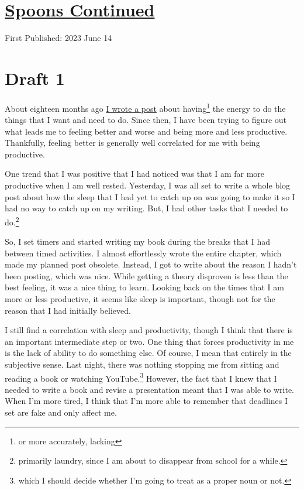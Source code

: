 \documentclass[12pt]{article}[titlepage]
\newcommand{\1}{\={a}}
\newcommand{\2}{\={e}}
\newcommand{\3}{\={\i}}
\newcommand{\4}{\=o}
\newcommand{\5}{\=u}
\newcommand{\6}{\={A}}
\renewcommand{\,}{\textsuperscript{,}}
\begin{document}
\doublespacing
\section{\href{spoons-2.html}{Spoons Continued}}
First Published: 2023 June 14

\section{Draft 1}
About eighteen months ago \href{spoons-and-spell-slots.html}{I wrote a post} about having\footnote{or more accurately, lacking} the energy to do the things that I want and need to do.
Since then, I have been trying to figure out what leads me to feeling better and worse and being more and less productive.
Thankfully, feeling better is generally well correlated for me with being productive.

One trend that I was positive that I had noticed was that I am far more productive when I am well rested.
Yesterday, I was all set to write a whole blog post about how the sleep that I had yet to catch up on was going to make it so I had no way to catch up on my writing.
But, I had other tasks that I needed to do.\footnote{primarily laundry, since I am about to disappear from school for a while.}

So, I set timers and started writing my book during the breaks that I had between timed activities.
I almost effortlessly wrote the entire chapter, which made my planned post obsolete.
Instead, I got to write about the reason I hadn't been posting, which was nice.
While getting a theory disproven is less than the best feeling, it was a nice thing to learn.
Looking back on the times that I am more or less productive, it seems like sleep is important, though not for the reason that I had initially believed.

I still find a correlation with sleep and productivity, though I think that there is an important intermediate step or two.
One thing that forces productivity in me is the lack of ability to do something else.
Of course, I mean that entirely in the subjective sense.
Last night, there was nothing stopping me from sitting and reading a book or watching YouTube.\footnote{which I should decide whether I'm going to treat as a proper noun or not.}
However, the fact that I knew that I needed to write a book and revise a presentation meant that I was able to write.
When I'm more tired, I think that I'm more able to remember that deadlines I set are fake and only affect me.
\end{document}
